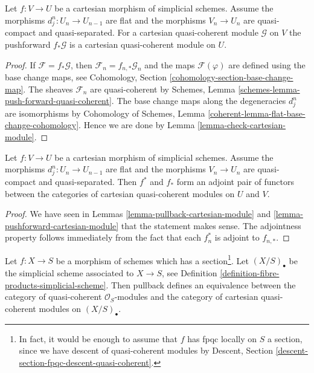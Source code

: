 \begin{lemma}
\label{lemma-pushforward-cartesian-module}
Let $f : V \to U$ be a cartesian morphism of simplicial schemes.
Assume the morphisms $d^n_j : U_n \to U_{n - 1}$ are
flat and the morphisms $V_n \to U_n$ are quasi-compact and quasi-separated.
For a cartesian quasi-coherent module $\mathcal{G}$ on $V$
the pushforward $f_* \mathcal{G}$ is a cartesian
quasi-coherent module on $U$.
\end{lemma}

\begin{proof}
If $\mathcal{F} = f_* \mathcal{G}$, then
$\mathcal{F}_n = f_{n , *}\mathcal{G}_n$ and the maps $\mathcal{F}(\varphi)$
are defined using the base change maps, see
Cohomology, Section \ref{cohomology-section-base-change-map}.
The sheaves $\mathcal{F}_n$ are quasi-coherent by
Schemes, Lemma \ref{schemes-lemma-push-forward-quasi-coherent}.
The base change maps along the degeneracies $d^n_j$ are isomorphisms
by Cohomology of Schemes, Lemma
\ref{coherent-lemma-flat-base-change-cohomology}.
Hence we are done by Lemma \ref{lemma-check-cartesian-module}.
\end{proof}

\begin{lemma}
\label{lemma-adjoint-functors-cartesian-modules}
Let $f : V \to U$ be a cartesian morphism of
simplicial schemes. Assume the morphisms $d^n_j : U_n \to U_{n - 1}$ are
flat and the morphisms $V_n \to U_n$ are quasi-compact and quasi-separated.
Then $f^*$ and $f_*$ form an adjoint pair of functors
between the categories of cartesian quasi-coherent modules on $U$ and $V$.
\end{lemma}

\begin{proof}
We have seen in Lemmas \ref{lemma-pullback-cartesian-module} and
\ref{lemma-pushforward-cartesian-module}
that the statement makes sense. The adjointness property follows
immediately from the fact that each $f_n^*$ is adjoint to $f_{n, *}$.
\end{proof}

\begin{lemma}
\label{lemma-cartesian-modules-with-section}
Let $f : X \to S$ be a morphism of schemes which has a
section\footnote{In fact, it would be enough to assume that $f$
has fpqc locally on $S$ a section, since we have descent of
quasi-coherent modules by Descent,
Section \ref{descent-section-fpqc-descent-quasi-coherent}.}.
Let $(X/S)_\bullet$ be the simplicial
scheme associated to $X \to S$, see
Definition \ref{definition-fibre-products-simplicial-scheme}.
Then pullback defines an equivalence between the category of
quasi-coherent $\mathcal{O}_S$-modules and the category of
cartesian quasi-coherent modules on $(X/S)_\bullet$.
\end{lemma}

